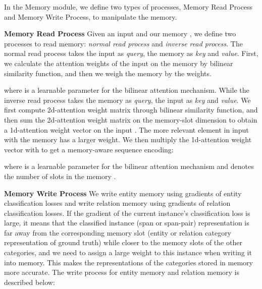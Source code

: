 \documentclass[sigconf]{acmart}
\begin{document}
In the Memory module, we define two types of processes, Memory Read Process and Memory Write Process, to manipulate the memory.


\noindent \textbf{Memory Read Process} Given an input  and our memory , we define two processes to read memory: \textit{normal read process} and \textit{inverse read process}. The normal read process takes the input as \textit{query}, the memory as \textit{key} and \textit{value}. First, we calculate the attention weights of the input  on the memory  by bilinear similarity function, and then we weigh the memory by the weights.









\noindent where  is a learnable parameter for the bilinear attention mechanism. While the inverse read process takes the memory as \textit{query}, the input as \textit{key} and \textit{value}. We first compute 2d-attention weight matrix through bilinear similarity function, and then sum the 2d-attention weight matrix on the memory-slot dimension to obtain a 1d-attention weight vector on the input . The more relevant element in input with the memory has a larger weight. We then multiply the 1d-attention weight vector with  to get a memory-aware sequence encoding:







\noindent where  is a learnable parameter for the bilinear attention mechanism and  denotes the number of slots in the memory .


\noindent \textbf{Memory Write Process} We write entity memory using gradients of entity classification losses and write relation memory using gradients of relation classification losses. If the gradient of the current instance's classification loss is large, it means that the classified instance (span or span-pair) representation is far away from the corresponding memory slot (entity or relation category representation of ground truth) while closer to the memory slots of the other categories, and we need to assign a large weight to this instance when writing it into memory. This makes the representations of the categories stored in memory more accurate. The write process for entity memory and relation memory is described below:
\end{document}
